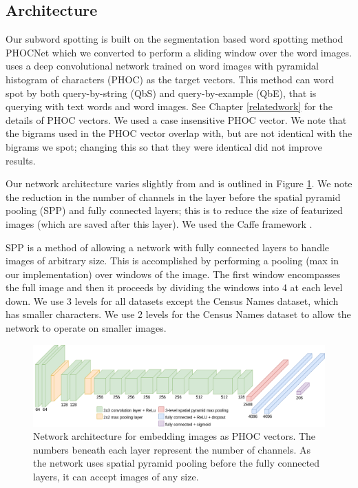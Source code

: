 \documentclass[ms,electronic,twosidetoc,letterpaper,chaptercenter,parttop,lol,lof,lot]{byumsphd}
\begin{document}
\subsection{Architecture}

Our subword spotting is built on the segmentation based word spotting method PHOCNet \cite{sudholt2016} which we converted to perform a sliding window over the word images. \cite{sudholt2016} uses a deep convolutional network trained on word images with pyramidal histogram of characters (PHOC) \cite{Almazan2014} as the target vectors. This method can word spot by both query-by-string (QbS) and query-by-example (QbE), that is querying with text words and word images. See Chapter \ref{relatedwork} for the details of PHOC vectors. We used a case insensitive PHOC vector. We note that the bigrams used in the PHOC vector overlap with, but are not identical with the bigrams we spot; changing this so that they were identical did not improve results. 



Our network architecture varies slightly from \cite{sudholt2016} and is outlined in Figure \ref{fig:network}. We note the reduction in the number of channels in the layer before the spatial pyramid pooling (SPP) and fully connected layers; this is to reduce the size of featurized images (which are saved after this layer).  We used the Caffe framework \cite{caffe}.

SPP \cite{SPP} is a method of allowing a network with fully connected layers to handle images of arbitrary size. This is accomplished by performing a pooling (max in our implementation) over windows of the image. The first window encompasses the full image and then it proceeds by dividing the windows into 4 at each level down. We use 3 levels for all datasets except the Census Names dataset, which has smaller characters. We use 2 levels for the Census Names dataset to allow the network to operate on smaller images.


\begin{figure}[t]
    \centering
    \includegraphics[width=.98\textwidth]{thesis-phocnet}
    \caption{Network architecture for embedding images as PHOC vectors. The numbers beneath each layer represent the number of channels. As the network uses spatial pyramid pooling before the fully connected layers, it can accept images of any size.}
    \label{fig:network}
\end{figure}
\end{document}
